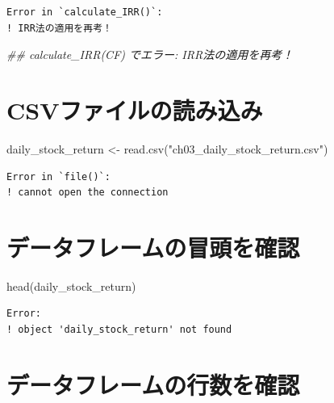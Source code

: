 \documentclass[
  letterpaper,
  DIV=11,
  numbers=noendperiod]{scrreprt}
\newenvironment{Shaded}{\begin{snugshade}}{\end{snugshade}}
\newcommand{\DocumentationTok}[1]{\textcolor[rgb]{0.37,0.37,0.37}{\textit{#1}}}
\newcommand{\FunctionTok}[1]{\textcolor[rgb]{0.28,0.35,0.67}{#1}}
\newcommand{\NormalTok}[1]{\textcolor[rgb]{0.00,0.23,0.31}{#1}}
\newcommand{\OtherTok}[1]{\textcolor[rgb]{0.00,0.23,0.31}{#1}}
\newcommand{\StringTok}[1]{\textcolor[rgb]{0.13,0.47,0.30}{#1}}
\begin{document}
\begin{verbatim}
Error in `calculate_IRR()`:
! IRR法の適用を再考！
\end{verbatim}

\begin{Shaded}
\begin{Highlighting}[]
\DocumentationTok{\#\#   calculate\_IRR(CF) でエラー: IRR法の適用を再考！}
\end{Highlighting}
\end{Shaded}

\section{CSVファイルの読み込み}\label{csvux30d5ux30a1ux30a4ux30ebux306eux8aadux307fux8fbcux307f}

\begin{Shaded}
\begin{Highlighting}[]
\NormalTok{daily\_stock\_return  }\OtherTok{\textless{}{-}} \FunctionTok{read.csv}\NormalTok{(}\StringTok{"ch03\_daily\_stock\_return.csv"}\NormalTok{) }
\end{Highlighting}
\end{Shaded}

\begin{verbatim}
Error in `file()`:
! cannot open the connection
\end{verbatim}

\section{データフレームの冒頭を確認}\label{ux30c7ux30fcux30bfux30d5ux30ecux30fcux30e0ux306eux5192ux982dux3092ux78baux8a8d}

\begin{Shaded}
\begin{Highlighting}[]
\FunctionTok{head}\NormalTok{(daily\_stock\_return)}
\end{Highlighting}
\end{Shaded}

\begin{verbatim}
Error:
! object 'daily_stock_return' not found
\end{verbatim}

\section{データフレームの行数を確認}\label{ux30c7ux30fcux30bfux30d5ux30ecux30fcux30e0ux306eux884cux6570ux3092ux78baux8a8d}
\end{document}
